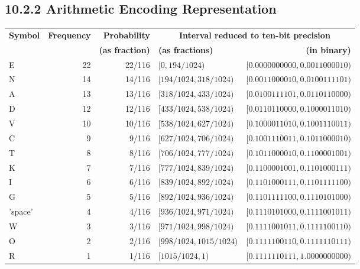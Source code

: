 \documentclass{article}
\begin{document}
\begin{adjustwidth}{2em}{2em}
		\subsection*{10.2.2 Arithmetic Encoding Representation}
		\begin{adjustwidth}{-2em}{}
			\begin{tabular}{|l|r|r|l|r|}
				\hline
				\multirow{2}{*}{\textbf{Symbol}} & \multirow{2}{*}{\textbf{Frequency}} & \textbf{Probability} & \multicolumn{2}{|c|}{\textbf{Interval reduced to ten-bit precision}} \\
				\cline{3-5}
				& & \textbf{(as fraction)} & \textbf{(as fractions)} & \textbf{(in binary)} \\
				\hline
				E & 22 & 22/116 & $[0, 194/1024)$ & $[0.0000000000, 0.0011000010)$ \\
				N & 14 & 14/116 & $[194/1024, 318/1024)$ & $[0.0011000010, 0.0100111101)$ \\
				A & 13 & 13/116 & $[318/1024, 433/1024)$ & $[0.0100111101, 0.0110110000)$ \\
				D & 12 & 12/116 & $[433/1024, 538/1024)$ & $[0.0110110000, 0.1000011010)$ \\
				V & 10 & 10/116 & $[538/1024, 627/1024)$ & $[0.1000011010, 0.1001110011)$ \\
				C & 9 & 9/116 & $[627/1024, 706/1024)$ & $[0.1001110011, 0.1011000010)$ \\
				T & 8 & 8/116 & $[706/1024, 777/1024)$ & $[0.1011000010, 0.1100001001)$ \\
				K & 7 & 7/116 & $[777/1024, 839/1024)$ & $[0.1100001001, 0.1101000111)$ \\
				I & 6 & 6/116 & $[839/1024, 892/1024)$ & $[0.1101000111, 0.1101111100)$ \\
				G & 5 & 5/116 & $[892/1024, 936/1024)$ & $[0.1101111100, 0.1110101000)$ \\
				'space' & 4 & 4/116 & $[936/1024, 971/1024)$ & $[0.1110101000, 0.1111001011)$ \\
				W & 3 & 3/116 & $[971/1024, 998/1024)$ & $[0.1111001011, 0.1111100110)$ \\
				O & 2 & 2/116 & $[998/1024, 1015/1024)$ & $[0.1111100110, 0.1111110111)$ \\
				R & 1 & 1/116 & $[1015/1024, 1)$ & $[0.1111110111, 1.0000000000)$ \\
				\hline
			\end{tabular}
		\end{adjustwidth}

\end{adjustwidth}
\end{document}
